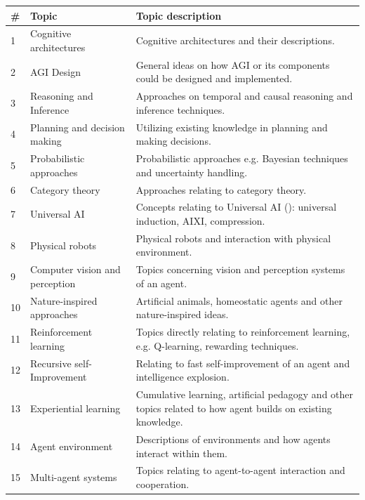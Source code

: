 \documentclass[utf8,english]{gradu3}
\begin{document}
\begin{table}[H]
  \footnotesize
  \centering
  \begin{tabular}{p{0.05\linewidth} p{0.30\linewidth} p{0.65\linewidth}}

    \textbf{\#} & \textbf{Topic}  & \textbf{Topic description}  \\ \hline
    1  & Cognitive architectures & Cognitive architectures and their descriptions.  \\ \hline
    2  & AGI Design & General ideas on how AGI or its components could be designed and implemented. \\ \hline
    3	 & Reasoning and Inference &  Approaches on temporal and causal reasoning and inference techniques. \\ \hline
    4	 & Planning and decision making & Utilizing existing knowledge in planning and making decisions. \\ \hline
    5	 & Probabilistic approaches & Probabilistic approaches e.g. Bayesian techniques and uncertainty handling.\\ \hline
    6	 & Category theory & Approaches relating to category theory.\\ \hline
    7	 & Universal AI & Concepts relating to Universal AI (\cite{hutter2004}): universal induction, AIXI, compression.\\ \hline
    8	 & Physical robots & Physical robots and interaction with physical environment. \\ \hline
    9	 & Computer vision and perception & Topics concerning vision and perception systems of an agent.\\ \hline
    10 & Nature-inspired approaches & Artificial animals, homeostatic agents and other nature-inspired ideas.\\ \hline
    11 & Reinforcement learning & Topics directly relating to reinforcement learning, e.g. Q-learning, rewarding techniques.\\ \hline
    12 & Recursive self-Improvement & Relating to fast self-improvement of an agent and intelligence explosion. \\ \hline
    13 & Experiential learning & Cumulative learning, artificial pedagogy and other topics related to how agent builds on existing knowledge.\\ \hline
    14 & Agent environment & Descriptions of environments and how agents interact within them.\\ \hline
    15 & Multi-agent systems & Topics relating to agent-to-agent interaction and cooperation.\\ \hline

\end{tabular}
\end{table}
\end{document}
